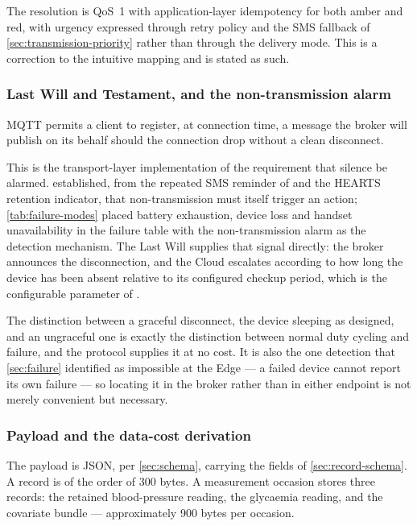\documentclass[12pt,a4paper,oneside]{report}
\begin{document}
The resolution is QoS~1 with application-layer idempotency for both amber and red, with urgency expressed through retry policy and the SMS fallback of \cref{sec:transmission-priority} rather than through the delivery mode. This is a correction to the intuitive mapping and is stated as such.

\subsubsection{Last Will and Testament, and the non-transmission alarm}

MQTT permits a client to register, at connection time, a message the broker will publish on its behalf should the connection drop without a clean disconnect.

This is the transport-layer implementation of the requirement that silence be alarmed.  established, from the repeated SMS reminder of \textcite{yazdani2018} and the HEARTS retention indicator, that non-transmission must itself trigger an action; \cref{tab:failure-modes} placed battery exhaustion, device loss and handset unavailability in the failure table with the non-transmission alarm as the detection mechanism. The Last Will supplies that signal directly: the broker announces the disconnection, and the Cloud escalates according to how long the device has been absent relative to its configured checkup period, which is the configurable parameter of \textcite{yazdani2018}.

The distinction between a graceful disconnect, the device sleeping as designed, and an ungraceful one is exactly the distinction between normal duty cycling and failure, and the protocol supplies it at no cost. It is also the one detection that \cref{sec:failure} identified as impossible at the Edge --- a failed device cannot report its own failure --- so locating it in the broker rather than in either endpoint is not merely convenient but necessary.

\subsubsection{Payload and the data-cost derivation}\label{sec:mqtt-payload}

The payload is JSON, per \cref{sec:schema}, carrying the fields of \cref{sec:record-schema}. A record is of the order of 300 bytes. A measurement occasion stores three records: the retained blood-pressure reading, the glycaemia reading, and the covariate bundle --- approximately 900 bytes per occasion.
\end{document}
